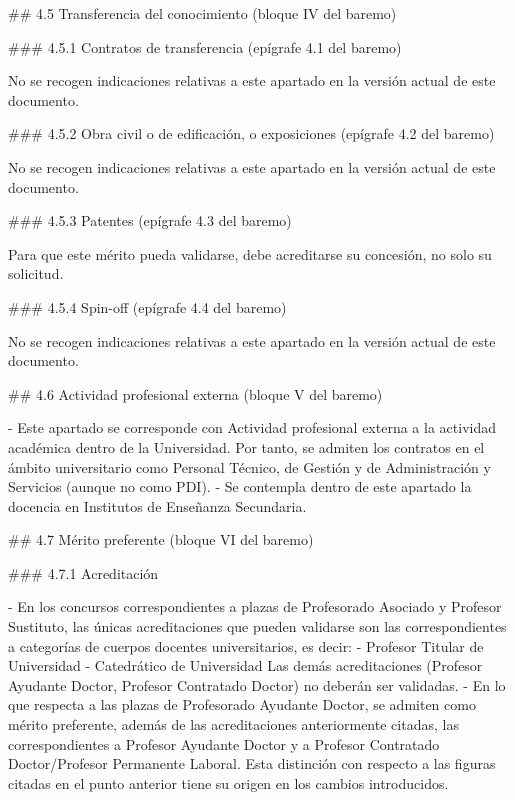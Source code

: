 \documentclass{article}
\begin{document}
\begin{itemize}
\begin{itemize}
\begin{scriptsize}
                  \#\# 4.5 Transferencia del conocimiento (bloque IV del baremo)

                  \#\#\# 4.5.1 Contratos de transferencia (epígrafe 4.1 del baremo)

                  No se recogen indicaciones relativas a este apartado en la versión actual de este documento.

                  \#\#\# 4.5.2 Obra civil o de edificación, o exposiciones (epígrafe 4.2 del baremo)

                  No se recogen indicaciones relativas a este apartado en la versión actual de este documento.

                  \#\#\# 4.5.3 Patentes (epígrafe 4.3 del baremo)

                  Para que este mérito pueda validarse, debe acreditarse su concesión, no solo su solicitud.

                  \#\#\# 4.5.4 Spin-off (epígrafe 4.4 del baremo)

                  No se recogen indicaciones relativas a este apartado en la versión actual de este documento.

                  \#\# 4.6 Actividad profesional externa (bloque V del baremo)

                  - Este apartado se corresponde con Actividad profesional externa a la actividad académica dentro de la Universidad. Por tanto, se admiten los contratos en el ámbito universitario como Personal Técnico, de Gestión y de Administración y Servicios (aunque no como PDI).
                  - Se contempla dentro de este apartado la docencia en Institutos de Enseñanza Secundaria.

                  \#\# 4.7 Mérito preferente (bloque VI del baremo)

                  \#\#\# 4.7.1 Acreditación

                  - En los concursos correspondientes a plazas de Profesorado Asociado y Profesor Sustituto, las únicas acreditaciones que pueden validarse son las correspondientes a categorías de cuerpos docentes universitarios, es decir:
                  - Profesor Titular de Universidad
                  - Catedrático de Universidad
                  Las demás acreditaciones (Profesor Ayudante Doctor, Profesor Contratado Doctor) no deberán ser validadas.
                  - En lo que respecta a las plazas de Profesorado Ayudante Doctor, se admiten como mérito preferente, además de las acreditaciones anteriormente citadas, las correspondientes a Profesor Ayudante Doctor y a Profesor Contratado Doctor/Profesor Permanente Laboral. Esta distinción con respecto a las figuras citadas en el punto anterior tiene su origen en los cambios introducidos.


\end{scriptsize}
\end{itemize}
\end{itemize}
\end{document}
